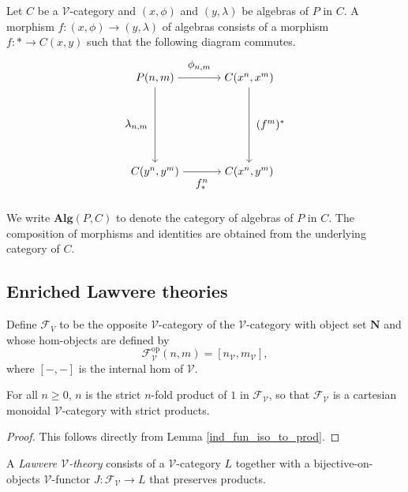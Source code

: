 \documentclass{tac}
\begin{document}
\begin{definition}
Let $C$ be a $\mathcal{V}$-category and $(x,\phi)$ and $(y,\lambda)$ be algebras of $P$ in $C$. A morphism $f:(x,\phi)\to(y,\lambda)$ of algebras consists of a morphism $f:*\to C(x,y)$ such that the following diagram commutes.
\[
\begin{tikzpicture}[node distance=3cm]
    \node (A) {$P(n,m)$};
    \node (B)[right of=A]{$C(x^n,x^m)$};
    \node (C)[below of=A]{$C(y^n,y^m)$};
    \node (D)[right of=C]{$C(x^n,y^m)$};
    \draw[->](A) to node[above=3]{$\phi_{n,m}$}(B);
    \draw[->](A) to node[left=3]{$\lambda_{n,m}$}(C);
    \draw[->](B) to node[right=3]{$(f^m)^*$}(D);
    \draw[->](C) to node[below=3]{$f^n_*$}(D);
\end{tikzpicture}
\]
\end{definition}

We write $\mathbf{Alg}(P,C)$ to denote the category of algebras of $P$ in $C$. The composition of morphisms and identities are obtained from the underlying category of $C$.

\subsection*{Enriched Lawvere theories}

\begin{definition}
Define $\mathcal{F}_V$ to be the opposite $\mathcal{V}$-category of the $\mathcal{V}$-category with object set $\mathbf{N}$ and whose hom-objects are defined by 
\[
\mathcal{F}^\text{op}_\mathcal{V}(n,m)=[n_\mathcal{V},m_{\mathcal{V}}],
\]
where $[-,-]$ is the internal hom of $\mathcal{V}$.
\end{definition}

\begin{lemma}
For all $n\geq 0$, $n$ is the strict $n$-fold product of $1$ in $\mathcal{F}_\mathcal{V}$, so that  $\mathcal{F}_\mathcal{V}$ is a cartesian monoidal $\mathcal{V}$-category with strict products.
\end{lemma}

\begin{proof}
This follows directly from Lemma \ref{ind_fun_iso_to_prod}.  
\end{proof}

\begin{definition}
    A \emph{Lawvere $\mathcal{V}$-theory} consists of a $\mathcal{V}$-category $L$ together with a bijective-on-objects $\mathcal{V}$-functor $J:\mathcal{F}_\mathcal{V}\to L$ that preserves products.
\end{definition}
\end{document}
